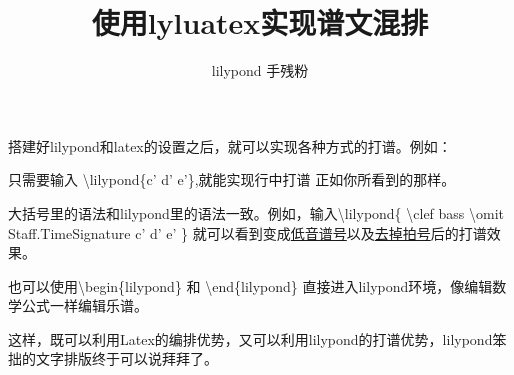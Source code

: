 \documentclass{article}
\begin{document}
\title{使用lyluatex实现谱文混排}
\author{lilypond 手残粉}

\maketitle


搭建好lilypond和latex的设置之后，就可以实现各种方式的打谱。例如：

只需要输入 \textbackslash lilypond\{c' d' e'\},就能实现行中打谱  正如你所看到的那样。

大括号里的语法和lilypond里的语法一致。例如，输入\textbackslash lilypond\{  \textbackslash clef bass  \textbackslash omit Staff.TimeSignature
c' d' e'  \} 就可以看到变成\underline{低音谱号}以及\underline{去掉拍号}后的打谱效果。

也可以使用\textbackslash begin\{lilypond\} 和 \textbackslash end\{lilypond\} 直接进入lilypond环境，像编辑数学公式一样编辑乐谱。

\vspace*{0.5\baselineskip}




这样，既可以利用Latex的编排优势，又可以利用lilypond的打谱优势，lilypond笨拙的文字排版终于可以说拜拜了。
\end{document}
